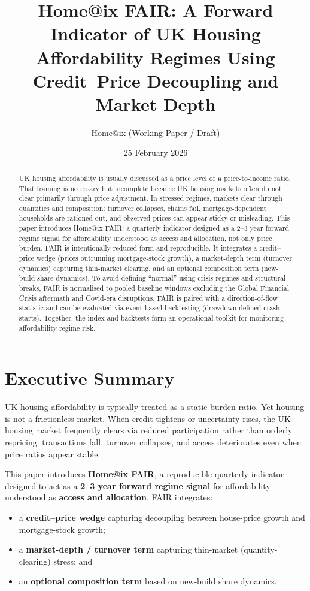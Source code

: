 \documentclass[11pt,a4paper]{article}
\title{\textbf{Home@ix FAIR: A Forward Indicator of UK Housing Affordability Regimes Using Credit--Price Decoupling and Market Depth}}
\author{Home@ix (Working Paper / Draft)}
\date{25 February 2026}
\begin{document}
\maketitle

\begin{abstract}
UK housing affordability is usually discussed as a price level or a price-to-income ratio. That framing is necessary but incomplete because UK housing markets often do not clear primarily through price adjustment. In stressed regimes, markets clear through quantities and composition: turnover collapses, chains fail, mortgage-dependent households are rationed out, and observed prices can appear sticky or misleading. This paper introduces Home@ix FAIR: a quarterly indicator designed as a 2--3 year forward regime signal for affordability understood as access and allocation, not only price burden. FAIR is intentionally reduced-form and reproducible. It integrates a credit--price wedge (prices outrunning mortgage-stock growth), a market-depth term (turnover dynamics) capturing thin-market clearing, and an optional composition term (new-build share dynamics). To avoid defining ``normal'' using crisis regimes and structural breaks, FAIR is normalised to pooled baseline windows excluding the Global Financial Crisis aftermath and Covid-era disruptions. FAIR is paired with a direction-of-flow statistic and can be evaluated via event-based backtesting (drawdown-defined crash starts). Together, the index and backtests form an operational toolkit for monitoring affordability regime risk.
\end{abstract}

\section{Executive Summary}
UK housing affordability is typically treated as a static burden ratio. Yet housing is not a frictionless market. When credit tightens or uncertainty rises, the UK housing market frequently clears via reduced participation rather than orderly repricing: transactions fall, turnover collapses, and access deteriorates even when price ratios appear stable.

This paper introduces \textbf{Home@ix FAIR}, a reproducible quarterly indicator designed to act as a \textbf{2--3 year forward regime signal} for affordability understood as \textbf{access and allocation}. FAIR integrates:
\begin{itemize}
  \item a \textbf{credit--price wedge} capturing decoupling between house-price growth and mortgage-stock growth;
  \item a \textbf{market-depth / turnover term} capturing thin-market (quantity-clearing) stress; and
  \item an \textbf{optional composition term} based on new-build share dynamics.
\end{itemize}
\end{document}

